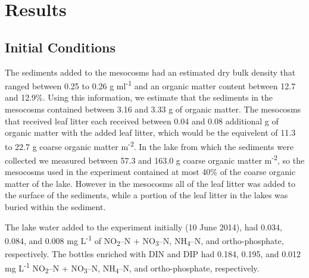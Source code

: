 \section{Results}
\subsection{Initial Conditions}
The sediments added to the mesocosms had an estimated dry bulk density that ranged between 0.25 to 0.26 g ml\textsuperscript{-1} and an organic matter content between 12.7 and 12.9\%. Using this information, we estimate that the sediments in the mesocosms contained between 3.16 and 3.33 g of organic matter.  The mesocosms that received leaf litter each received between 0.04 and 0.08 additional g of organic matter with the added leaf litter, which would be the equivelent of 11.3 to 22.7 g coarse organic matter m\textsuperscript{-2}. In the lake from which the sediments were collected we measured between 57.3 and 163.0 g coarse organic matter m\textsuperscript{-2}, so the mesocosms used in the experiment contained at most 40\% of the coarse organic matter of the lake. However in the mesocosms all of the leaf litter was added to the surface of the sediments, while a portion of the leaf litter in the lakes was buried within the sediment.

The lake water added to the experiment initially (10 June 2014), had 0.034, 0.084, and 0.008 mg L\textsuperscript{-1} of NO\textsubscript{2}--N + NO\textsubscript{3}--N, NH\textsubscript{4}--N, and ortho-phosphate, respectively. The bottles enriched with DIN and DIP had 0.184, 0.195, and 0.012 mg L\textsuperscript{-1} NO\textsubscript{2}--N + NO\textsubscript{3}--N, NH\textsubscript{4}--N, and ortho-phosphate, respectively.



    